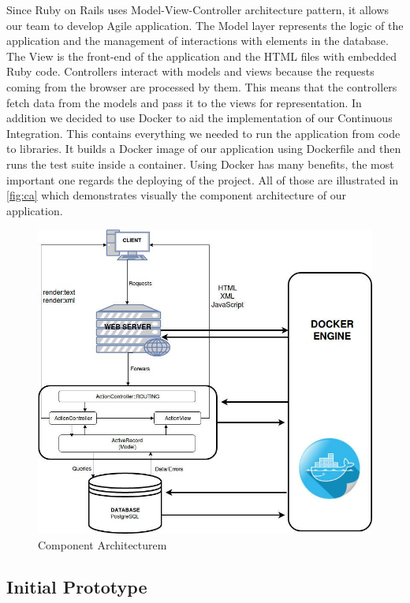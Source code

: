 \documentclass{l3proj}
\begin{document}
Since Ruby on Rails uses Model-View-Controller architecture pattern, it allows our team to develop Agile application. The Model layer represents the logic of the application and the management of interactions with elements in the database. The View is the front-end of the application and the HTML files with embedded Ruby code. Controllers interact with models and views because the requests coming from the browser are processed by them. This means that the controllers fetch data from the models and pass it to the views for representation.
In addition we decided to use Docker \cite{Docker} to aid the implementation of our Continuous Integration. This contains everything we needed to run the application from code to libraries. It builds a Docker image of our application using Dockerfile and then runs the test suite inside a container. Using Docker has many benefits, the most important one regards the deploying of the project.
All of those are illustrated in \autoref{fig:ca} which demonstrates visually the component architecture of our application.

\begin{figure}[h]
\centerline{\includegraphics[width=\textwidth, height=\textheight, keepaspectratio]{component.png}}
\caption{Component Architecturem}
\label{fig:ca}
\end{figure}

\subsection{Initial Prototype}
\label{sec:prototype1}
\end{document}
